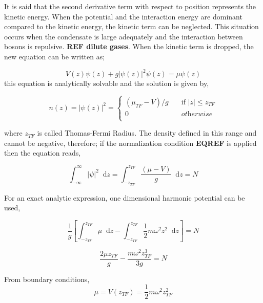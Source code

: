 \documentclass[a4paper,times,hidelinks,12pt]{article}
\newcommand*\dif{\mathop{}\!\mathrm{d}}
\begin{document}
It is said that the second derivative term with respect to position represents the kinetic energy. When the potential and the interaction energy are dominant compared to the kinetic energy, the kinetic term can be neglected. This situation occurs when the condensate is large adequately and the interaction between bosons is repulsive. \textbf{REF dilute gases}. When the kinetic term is dropped, the new equation can be written as;

\begin{equation}
\label{eq:GPE_1D_thomas_fermi}
    V(z)\psi(z) + g|\psi(z)|^2\psi(z) = \mu\psi(z)
\end{equation}
this equation is analytically solvable and the solution is given by,


\begin{equation}
\label{eq:thomas_fermi_solution}    
n(z) = |\psi(z)|^2 =  
    \begin{cases}
        (\mu_{TF} - V)/g &\quad\text{if }  |z| \le z_{TF}  \\
        0 &\quad \textit{otherwise} \\
    \end{cases}
\end{equation}

where $z_{TF}$ is called Thomas-Fermi Radius. The density defined in this range and cannot be negative, therefore; if the normalization condition \textbf{EQREF} is applied then the equation reads,  

\begin{equation}
    \label{eq:thomas_fermi_mu_integral}
        \int_{-\infty}^{\infty} |\psi|^2 \dif z = \int_{-z_{TF}}^{z_{TF}} \frac{(\mu - V)}{g} \dif z = N 
    \end{equation}

For an exact analytic expression, one dimensional harmonic potential can be used, 

\begin{equation}
   \frac{1}{g} \left [ \int_{-z_{TF}}^{z_{TF}} \mu \dif z - \int_{-z_{TF}}^{z_{TF}} \frac{1}{2}m\omega^2z^2 \dif z \right ] = N
\end{equation}

\begin{equation}
    \frac{2\mu z_{TF}}{g} - \frac{m\omega^2 z_{TF}^3}{3g} = N
\end{equation}


From boundary conditions,
\begin{equation}
\label{eq:thomas_fermi_mu_bound}
    \mu = V(z_{TF}) = \frac{1}{2}m\omega^2z_{TF}^2    
\end{equation}
\end{document}
